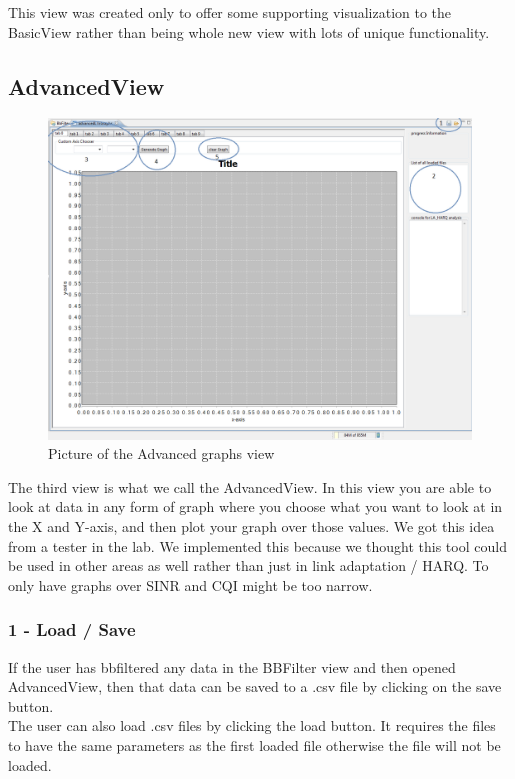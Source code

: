 \documentclass[cropmarks, frame, english]{idamasterthesis}
\begin{document}
This view was created only to offer some supporting visualization to the BasicView rather than being whole new view with lots of unique functionality.


\subsection{AdvancedView}
	
\begin{figure}[H]
\includegraphics[width=\textwidth]{AdvancedView}
\centering
\caption{Picture of the Advanced graphs view}
\end{figure}

The third view is what we call the AdvancedView. In this view you are able to look at data in any form of graph where you choose what you want to look at in the X and Y-axis, and then plot your graph over those values. We got this idea from a tester in the lab. We implemented this because we thought this tool could be used in other areas as well rather than just in link adaptation / HARQ. To only have graphs over SINR and CQI might be too narrow. \\



\subsubsection{1 - Load / Save}
If the user has bbfiltered any data in the BBFilter view and then opened AdvancedView, then that data can be saved to a .csv file by clicking on the save button. \\
The user can also load .csv files by clicking the load button. It requires the files to have the same parameters as the first loaded file otherwise the file will not be loaded.
\end{document}
